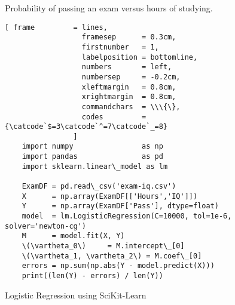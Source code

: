 \begin{figure}[!th]
\caption{Probability of passing an exam versus hours of studying.}
\label{fig:exam-iq.pdf}
\end{figure}



\begin{figure}[!ht]
\centering
\begin{Verbatim}[ frame         = lines, 
                  framesep      = 0.3cm, 
                  firstnumber   = 1,
                  labelposition = bottomline,
                  numbers       = left,
                  numbersep     = -0.2cm,
                  xleftmargin   = 0.8cm,
                  xrightmargin  = 0.8cm,
                  commandchars  = \\\{\},
                  codes         = {\catcode`$=3\catcode`^=7\catcode`_=8}
                ]
    import numpy                as np
    import pandas               as pd
    import sklearn.linear\_model as lm
    
    ExamDF = pd.read\_csv('exam-iq.csv')
    X      = np.array(ExamDF[['Hours','IQ']])
    Y      = np.array(ExamDF['Pass'], dtype=float)
    model  = lm.LogisticRegression(C=10000, tol=1e-6, solver='newton-cg')
    M      = model.fit(X, Y)
    \(\vartheta_0\)     = M.intercept\_[0]
    \(\vartheta_1, \vartheta_2\) = M.coef\_[0]
    errors = np.sum(np.abs(Y - model.predict(X)))
    print((len(Y) - errors) / len(Y))
\end{Verbatim}
\vspace*{-0.3cm}
\caption{Logistic Regression using SciKit-Learn}
\label{fig:Logistic-Regression-with-SciKit-Learn.ipynb}
\end{figure}

